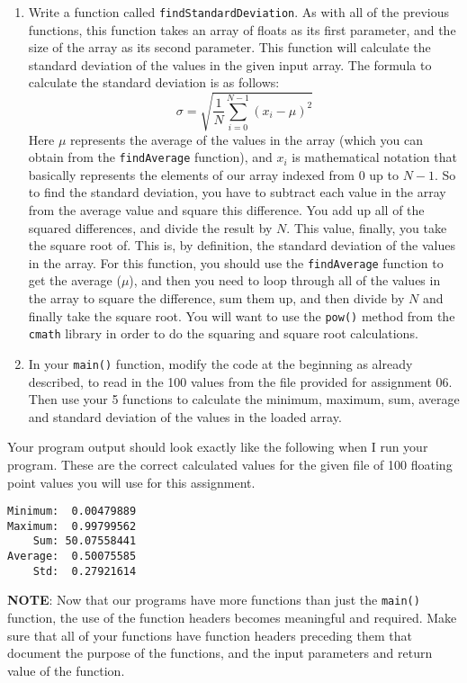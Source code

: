 \documentclass[11pt]{article}
\begin{document}
\begin{enumerate}
\item Write a function called \verb~findStandardDeviation~.  As with all of the
previous functions, this function takes an array of floats as its
first parameter, and the size of the array as its second parameter.
This function will calculate the standard deviation of the values
in the given input array.  The formula to calculate the standard deviation
is as follows:
$$
   \sigma = \sqrt{\frac{1}{N} \sum_{i=0}^{N-1} (x_i - \mu)^2}
   $$
Here $\mu$ represents the average of the values in the array (which
you can obtain from the \verb~findAverage~ function), and $x_i$ is
mathematical notation that basically represents the elements of our
array indexed from $0$ up to $N-1$.  So to find the standard
deviation, you have to subtract each value in the array from the
average value and square this difference.  You add up all of the
squared differences, and divide the result by $N$.  This value,
finally, you take the square root of.  This is, by definition, the
standard deviation of the values in the array.  For this function,
you should use the \verb~findAverage~ function to get the average
($\mu$), and then you need to loop through all of the values in the
array to square the difference, sum them up, and then divide by $N$
and finally take the square root.  You will want to use the \verb~pow()~
method from the \verb~cmath~ library in order to do the squaring and
square root calculations.

\item In your \verb~main()~ function, modify the code at the beginning as
already described, to read in the 100 values from the file provided
for assignment 06.  Then use your 5 functions to calculate the
minimum, maximum, sum, average and standard deviation of the values
in the loaded array.
\end{enumerate}

Your program output should look exactly like the following when I run
your program. These are the correct calculated values for the given
file of 100 floating point values you will use for this assignment.

\begin{verbatim}
Minimum:  0.00479889
Maximum:  0.99799562
    Sum: 50.07558441
Average:  0.50075585
    Std:  0.27921614
\end{verbatim}


\textbf{NOTE}: Now that our programs have more functions than just the
\verb~main()~ function, the use of the function headers becomes meaningful
and required.  Make sure that all of your functions have function
headers preceding them that document the purpose of the functions, and
the input parameters and return value of the function.
\end{document}
